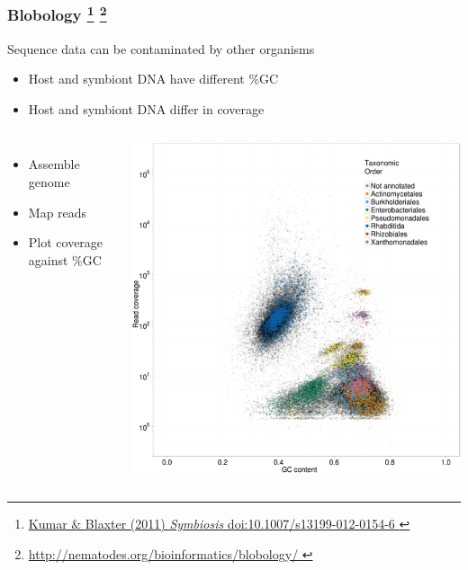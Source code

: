 %
\begin{frame}
  \frametitle{Blobology
  \footnote{\tiny{\href{http://dx.doi.org/10.1007/s13199-012-0154-6
}{Kumar \& Blaxter (2011) \textit{Symbiosis} doi:10.1007/s13199-012-0154-6
}}}
  \footnote{\tiny{\href{http://nematodes.org/bioinformatics/blobology/
}{http://nematodes.org/bioinformatics/blobology/
}}}  
  }
  Sequence data can be contaminated by other organisms
  \begin{itemize}
    \item \textcolor{hutton_green}{Host and symbiont DNA have different \%GC}
    \item \textcolor{hutton_green}{Host and symbiont DNA differ in coverage}
  \end{itemize}
  \begin{columns}[T] 
      \begin{itemize}
        \item \textcolor{RawSienna}{Assemble genome}
        \item \textcolor{hutton_blue}{Map reads}
        \item \textcolor{hutton_purple}{Plot coverage against \%GC}
      \end{itemize}
      \includegraphics[width=\textwidth]{images/blobology}
  \end{columns}    
\end{frame}

